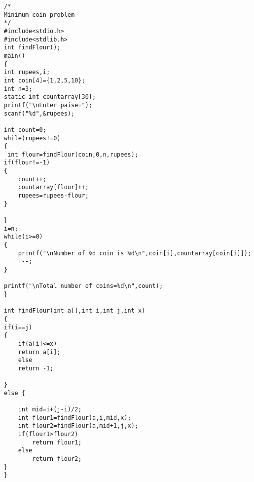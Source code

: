 \documentclass{article}
\begin{document}
\begin{verbatim}
/*
Minimum coin problem 
*/
#include<stdio.h>
#include<stdlib.h>
int findFlour();
main()
{
int rupees,i;
int coin[4]={1,2,5,10};
int n=3;
static int countarray[30];
printf("\nEnter paise=");
scanf("%d",&rupees);

int count=0;
while(rupees!=0)
{
 int flour=findFlour(coin,0,n,rupees);
if(flour!=-1)
{
	count++;
	countarray[flour]++;
	rupees=rupees-flour;
}

}
i=n;
while(i>=0)
{
	printf("\nNumber of %d coin is %d\n",coin[i],countarray[coin[i]]);
	i--;
}

printf("\nTotal number of coins=%d\n",count);
}

int findFlour(int a[],int i,int j,int x)
{
if(i==j)
{
	if(a[i]<=x)
	return a[i];
	else
	return -1;

}
else {

	int mid=i+(j-i)/2;
	int flour1=findFlour(a,i,mid,x);
	int flour2=findFlour(a,mid+1,j,x);
	if(flour1>flour2)
		return flour1;
	else 
		return flour2;
}
}

\end{verbatim}
\end{document}
